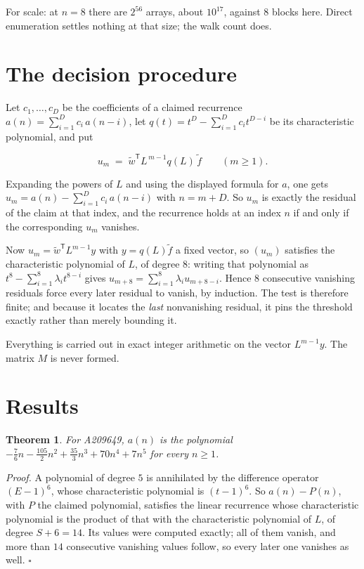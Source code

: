 \documentclass[11pt]{article}
\newtheorem{theorem}{Theorem}
\theoremstyle{definition}
\begin{document}
For scale: at $n = 8$ there are $2^{56}$ arrays, about $10^{17}$, against $8$ blocks here. Direct enumeration settles nothing at that size; the walk count does.

\section{The decision procedure}

Let $c_1,\dots,c_D$ be the coefficients of a claimed recurrence $a(n) = \sum_{i=1}^{D} c_i\,a(n-i)$, let $q(t) = t^{D} - \sum_{i=1}^{D} c_i t^{D-i}$ be its characteristic polynomial, and put

\[u_m \;=\; \tilde w^{\mathsf T} L^{\,m-1} q(L)\,\tilde f \qquad (m \ge 1).\]

Expanding the powers of $L$ and using the displayed formula for $a$, one gets $u_m = a(n) - \sum_{i=1}^{D} c_i\,a(n-i)$ with $n = m + D$. So $u_m$ is exactly the residual of the claim at that index, and the recurrence holds at an index $n$ if and only if the corresponding $u_m$ vanishes.

Now $u_m = \tilde w^{\mathsf T} L^{m-1} y$ with $y = q(L)\tilde f$ a fixed vector, so $(u_m)$ satisfies the characteristic polynomial of $L$, of degree $8$: writing that polynomial as $t^{8} - \sum_{i=1}^{8} \lambda_i t^{8-i}$ gives $u_{m+8} = \sum_{i=1}^{8} \lambda_i u_{m+8-i}$. Hence $8$ consecutive vanishing residuals force every later residual to vanish, by induction. The test is therefore finite; and because it locates the {\itshape last} nonvanishing residual, it pins the threshold exactly rather than merely bounding it.

Everything is carried out in exact integer arithmetic on the vector $L^{m-1}y$. The matrix $M$ is never formed.

\section{Results}

\begin{theorem} For A209649, $a(n)$ is the polynomial $-\frac{7}{6}n - \frac{105}{2}n^{2} + \frac{35}{3}n^{3} + 70n^{4} + 7n^{5}$ for every $n \ge 1$.\end{theorem}

{\itshape Proof.} A polynomial of degree $5$ is annihilated by the difference operator $(E-1)^{6}$, whose characteristic polynomial is $(t-1)^{6}$. So $a(n) - P(n)$, with $P$ the claimed polynomial, satisfies the linear recurrence whose characteristic polynomial is the product of that with the characteristic polynomial of $L$, of degree $S + 6 = 14$. Its values were computed exactly; all of them vanish, and more than $14$ consecutive vanishing values follow, so every later one vanishes as well. $\square$
\end{document}
